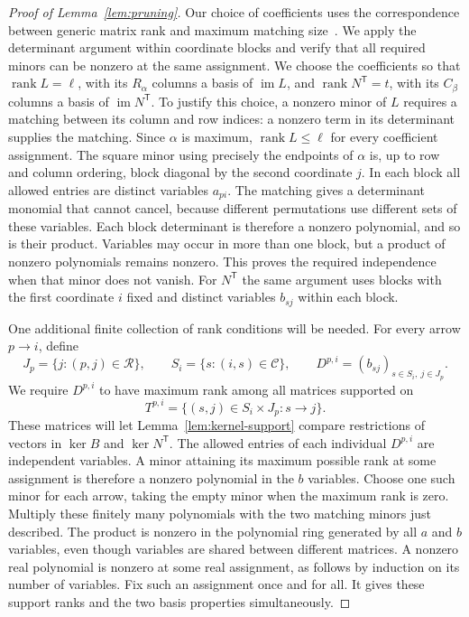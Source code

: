 \documentclass[11pt]{article}
\theoremstyle{remark}
\DeclareMathOperator{\rank}{rank}
\DeclareMathOperator{\im}{im}
\begin{document}
\begin{proof}[Proof of Lemma~\ref{lem:pruning}]
Our choice of coefficients uses the correspondence between generic matrix
rank and maximum matching size~\cite[Section~5, Theorem~1]{Edmonds1967}.
We apply the determinant argument within coordinate blocks and verify that
all required minors can be nonzero at the same assignment.
We choose the coefficients so that $\rank L=\ell$, with its
$R_\alpha$ columns a basis of $\im L$, and
$\rank N^{\mathsf T}=t$, with its $C_\beta$ columns a basis of
$\im N^{\mathsf T}$.  To justify this choice, a nonzero minor of $L$
requires a matching between its column and row indices: a nonzero term
in its determinant supplies the matching.  Since $\alpha$ is maximum,
$\rank L\leq\ell$ for every coefficient assignment.  The square minor
using precisely the endpoints of $\alpha$ is, up to row and column
ordering, block diagonal by the second coordinate $j$.  In each block
all allowed entries are distinct variables $a_{pi}$.  The matching
gives a determinant monomial that cannot cancel, because different
permutations use different sets of these variables.  Each block
determinant is therefore a nonzero polynomial, and so is their product.
Variables may occur in more than one block, but a product of nonzero
polynomials remains nonzero.  This proves the required independence
when that minor does not vanish.  For $N^{\mathsf T}$ the same argument
uses blocks with the first coordinate $i$ fixed and distinct variables
$b_{sj}$ within each block.

One additional finite collection of rank conditions will be needed.
For every arrow $p\to i$, define
\[
 J_p=\{j:(p,j)\in\mathcal R\},\qquad
 S_i=\{s:(i,s)\in\mathcal C\},\qquad
 D^{p,i}=(b_{sj})_{s\in S_i,\ j\in J_p}.
\]
We require $D^{p,i}$ to have maximum rank among all matrices supported
on
\[
 T^{p,i}=\{(s,j)\in S_i\times J_p:s\to j\}.
\]
These matrices will let Lemma~\ref{lem:kernel-support} compare restrictions
of vectors in $\ker B$ and $\ker N^{\mathsf T}$.
The allowed entries of each individual $D^{p,i}$ are independent
variables.  A minor attaining its maximum possible rank at some
assignment is therefore a nonzero polynomial in the $b$ variables.
Choose one such minor for each arrow, taking the empty minor when the
maximum rank is zero.  Multiply these finitely many polynomials with
the two matching minors just described.  The product is nonzero in the
polynomial ring generated by all $a$ and $b$ variables, even though
variables are shared between different matrices.  A nonzero real
polynomial is nonzero at some real assignment, as follows by induction
on its number of variables.  Fix such an assignment once and for all.
It gives these support ranks and the two basis properties simultaneously.


\end{proof}
\end{document}
